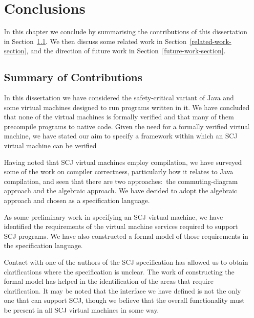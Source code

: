 \documentclass[a4paper,10pt]{report}
\begin{document}








\chapter{Conclusions}
\label{conclusions-chapter}
In this chapter we conclude by summarising the contributions of this
dissertation in Section~\ref{summary-section}.
We then discuss some related work in
Section~\ref{related-work-section}, and the direction of future work
in Section~\ref{future-work-section}.

\section{Summary of Contributions}
\label{summary-section}

In this dissertation we have considered the safety-critical variant of
Java and some virtual machines designed to run programs written in it.
We have concluded that none of the virtual machines is formally
verified and that many of them precompile programs to native code.
Given the need for a formally verified virtual machine, we have stated
our aim to specify a framework within which an SCJ virtual machine can
be verified

Having noted that SCJ virtual machines employ compilation, we have
surveyed some of the work on compiler correctness, particularly how it
relates to Java compilation, and seen that there are two
approaches:~the commuting-diagram approach and the algebraic approach.
We have decided to adopt the algebraic approach and chosen \Circus{}
as a specification language.

As some preliminary work in specifying an SCJ virtual machine, we have
identified the requirements of the virtual machine services required
to support SCJ programs.
We have also constructed a formal model of those requirements in the
\Circus{} specification language.

Contact with one of the authors of the SCJ specification has allowed
us to obtain clarifications where the specification is unclear.
The work of constructing the formal model has helped in the
identification of the areas that require clarification.
It may be noted that the interface we have defined is not the only one
that can support SCJ, though we believe that the overall functionality
must be present in all SCJ virtual machines in some way.
\end{document}
